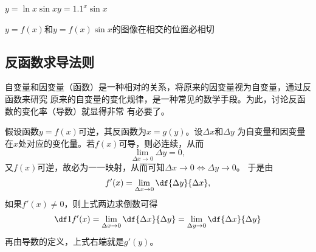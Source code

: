 \begin{shaded}
\begin{center}
		\quad
		
		$y=\ln x\sin x$\hspace{5cm}$y=1.1^x\sin x$
		
		\kaishu $y=f(x)$和$y=f(x)\sin x$的图像在相交的位置必相切
	\end{center}
\end{shaded}

\subsection{反函数求导法则}

自变量和因变量（函数）是一种相对的关系，将原来的因变量视为自变量，通过反函数来研究
原来的自变量的变化规律，是一种常见的数学手段。为此，讨论反函数的变化率（导数）就显得非常
有必要了。

假设函数$y=f(x)$可逆，其反函数为$x=g(y)$。设$\Delta x$和$\Delta y$
为自变量和因变量在$x$处对应的变化量。若$f(x)$可导，则必连续，从而
$$\lim\limits_{\Delta x\to 0}\Delta y=0,$$
又$f(x)$可逆，故必为一一映射，从而可知$\Delta x\to0\Leftrightarrow\Delta y\to0$。
于是由
$$f'(x)=\lim\limits_{\Delta x\to 0}\df{\Delta y}{\Delta x},$$
如果$f'(x)\ne 0$，则上式两边求倒数可得
$$
	\df1{f'(x)}=\lim\limits_{\Delta x\to 0}\df{\Delta x}{\Delta y}
	=\lim\limits_{\Delta y\to 0}\df{\Delta x}{\Delta y}
$$
再由导数的定义，上式右端就是$g'(y)$。

